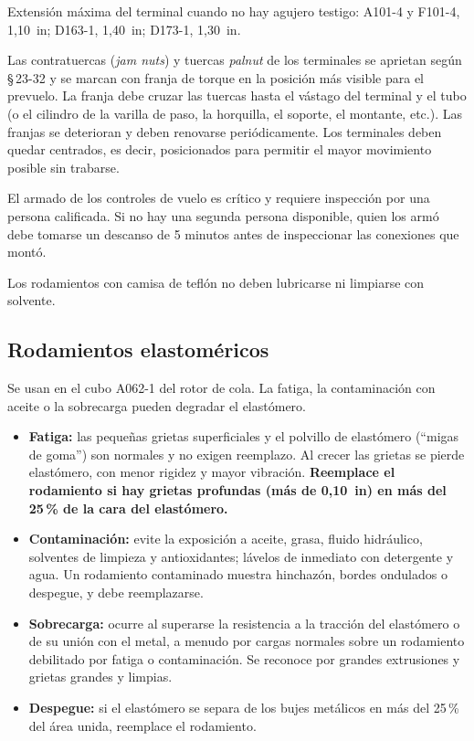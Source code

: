 Extensión máxima del terminal cuando no hay agujero testigo: A101-4 y F101-4, 1,10~in; D163-1, 1,40~in; D173-1, 1,30~in.

Las contratuercas (\emph{jam nuts}) y tuercas \emph{palnut} de los terminales se aprietan según \S\,23-32 y se marcan con franja de torque en la posición más visible para el prevuelo. La franja debe cruzar las tuercas hasta el vástago del terminal y el tubo (o el cilindro de la varilla de paso, la horquilla, el soporte, el montante, etc.). Las franjas se deterioran y deben renovarse periódicamente. Los terminales deben quedar centrados, es decir, posicionados para permitir el mayor movimiento posible sin trabarse.

\begin{advertencia}
El armado de los controles de vuelo es crítico y requiere inspección por una persona calificada. Si no hay una segunda persona disponible, quien los armó debe tomarse un descanso de 5 minutos antes de inspeccionar las conexiones que montó.
\end{advertencia}

\begin{precaucion}
Los rodamientos con camisa de teflón no deben lubricarse ni limpiarse con solvente.
\end{precaucion}

\subsection{Rodamientos elastoméricos}

Se usan en el cubo A062-1 del rotor de cola. La fatiga, la contaminación con aceite o la sobrecarga pueden degradar el elastómero.

\begin{itemize}
\item \textbf{Fatiga:} las pequeñas grietas superficiales y el polvillo de elastómero (``migas de goma'') son normales y no exigen reemplazo. Al crecer las grietas se pierde elastómero, con menor rigidez y mayor vibración. \textbf{Reemplace el rodamiento si hay grietas profundas (más de 0,10~in) en más del 25\,\% de la cara del elastómero.}
\item \textbf{Contaminación:} evite la exposición a aceite, grasa, fluido hidráulico, solventes de limpieza y antioxidantes; lávelos de inmediato con detergente y agua. Un rodamiento contaminado muestra hinchazón, bordes ondulados o despegue, y debe reemplazarse.
\item \textbf{Sobrecarga:} ocurre al superarse la resistencia a la tracción del elastómero o de su unión con el metal, a menudo por cargas normales sobre un rodamiento debilitado por fatiga o contaminación. Se reconoce por grandes extrusiones y grietas grandes y limpias.
\item \textbf{Despegue:} si el elastómero se separa de los bujes metálicos en más del 25\,\% del área unida, reemplace el rodamiento.
\end{itemize}

